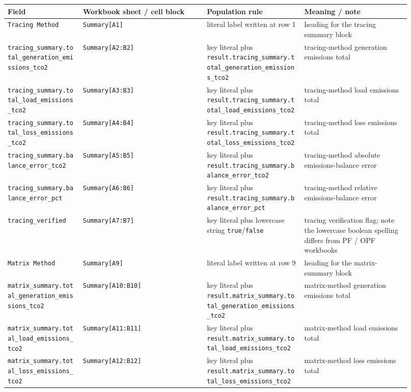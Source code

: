 \begin{longtable}{@{}L{0.17\linewidth}L{0.29\linewidth}L{0.22\linewidth}L{0.24\linewidth}@{}}
\toprule
Field & Workbook sheet / cell block & Population rule & Meaning / note \\
\midrule
\endhead
\texttt{Tracing Method} & \texttt{Summary[A1]} & literal label written at row 1 & heading for the tracing summary block \\
\texttt{tracing\_summary.total\_generation\_emissions\_tco2} & \texttt{Summary[A2:B2]} & key literal plus \texttt{result.tracing\_summary.total\_generation\_emissions\_tco2} & tracing-method generation emissions total \\
\texttt{tracing\_summary.total\_load\_emissions\_tco2} & \texttt{Summary[A3:B3]} & key literal plus \texttt{result.tracing\_summary.total\_load\_emissions\_tco2} & tracing-method load emissions total \\
\texttt{tracing\_summary.total\_loss\_emissions\_tco2} & \texttt{Summary[A4:B4]} & key literal plus \texttt{result.tracing\_summary.total\_loss\_emissions\_tco2} & tracing-method loss emissions total \\
\texttt{tracing\_summary.balance\_error\_tco2} & \texttt{Summary[A5:B5]} & key literal plus \texttt{result.tracing\_summary.balance\_error\_tco2} & tracing-method absolute emissions-balance error \\
\texttt{tracing\_summary.balance\_error\_pct} & \texttt{Summary[A6:B6]} & key literal plus \texttt{result.tracing\_summary.balance\_error\_pct} & tracing-method relative emissions-balance error \\
\texttt{tracing\_verified} & \texttt{Summary[A7:B7]} & key literal plus lowercase string \texttt{true}/\texttt{false} & tracing verification flag; note the lowercase boolean spelling differs from PF / OPF workbooks \\
\texttt{Matrix Method} & \texttt{Summary[A9]} & literal label written at row 9 & heading for the matrix-summary block \\
\texttt{matrix\_summary.total\_generation\_emissions\_tco2} & \texttt{Summary[A10:B10]} & key literal plus \texttt{result.matrix\_summary.total\_generation\_emissions\_tco2} & matrix-method generation emissions total \\
\texttt{matrix\_summary.total\_load\_emissions\_tco2} & \texttt{Summary[A11:B11]} & key literal plus \texttt{result.matrix\_summary.total\_load\_emissions\_tco2} & matrix-method load emissions total \\
\texttt{matrix\_summary.total\_loss\_emissions\_tco2} & \texttt{Summary[A12:B12]} & key literal plus \texttt{result.matrix\_summary.total\_loss\_emissions\_tco2} & matrix-method loss emissions total \\

\end{longtable}
